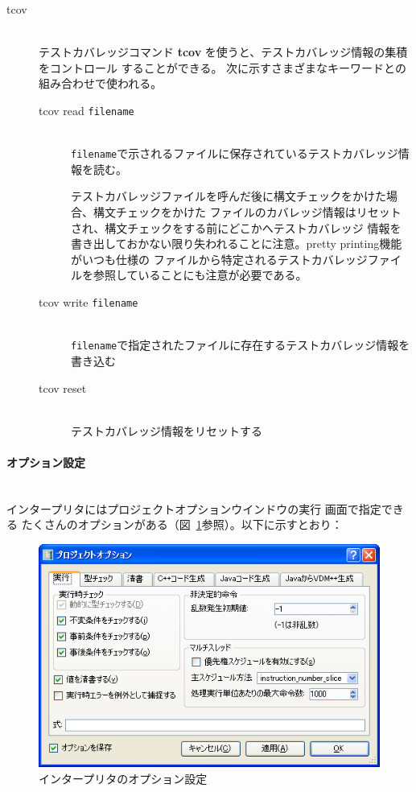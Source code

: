 \documentclass[\pformat,12pt]{jarticle}
\newcommand{\subsubsubsection}[1]{\paragraph{#1}\mbox{}\\}
\newcommand{\guicmd}[1]{{\gt #1}}
\begin{document}
\begin{description}
\item[tcov]\mbox{}\\
テストカバレッジコマンド {\bf tcov} を使うと、テストカバレッジ情報の集積をコントロール
することができる。
次に示すさまざまなキーワードとの組み合わせで使われる。

\begin{description}
\item[tcov read \mbox{\texttt{filename}}] \mbox{}\\ 
  \texttt{filename}で示されるファイルに保存されているテストカバレッジ情報を読む。
  
  テストカバレッジファイルを呼んだ後に構文チェックをかけた場合、構文チェックをかけた
  ファイルのカバレッジ情報はリセットされ、構文チェックをする前にどこかへテストカバレッジ
  情報を書き出しておかない限り失われることに注意。pretty printing機能がいつも仕様の
  ファイルから特定されるテストカバレッジファイルを参照していることにも注意が必要である。

\item[tcov write \mbox{\texttt{filename}}] \mbox{} \\ 
  \texttt{filename}で指定されたファイルに存在するテストカバレッジ情報を書き込む
  
\item[tcov reset] \mbox{} \\
  テストカバレッジ情報をリセットする
  
\end{description}

\end{description}


\subsubsubsection{オプション設定}


インタープリタには\guicmd{プロジェクトオプション}ウインドウの\guicmd{実行} 画面で指定できる
たくさんのオプションがある（図~\ref{fig:optint}参照）。以下に示すとおり：

\begin{figure}[tbh]
\begin{center}
\includegraphics[width=12.5cm]{interpreterOptions-pp.png}
\caption{インタープリタのオプション設定}
\label{fig:optint}
\end{center}
\end{figure}
\end{document}
